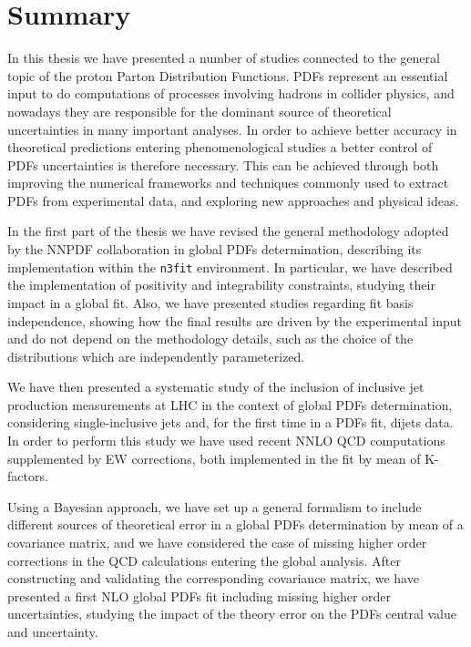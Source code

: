 \chapter{Summary}
\label{ch:conclusions}
In this thesis we have presented a number of studies connected to the general topic of the proton Parton Distribution Functions.
PDFs represent an essential input to do computations of processes involving hadrons in collider physics, and nowadays
they are responsible for the dominant source of theoretical uncertainties in many important analyses.
In order to achieve better accuracy in theoretical predictions entering phenomenological studies 
a better control of PDFs uncertainties is therefore necessary. This can be achieved through both
improving the numerical frameworks and techniques commonly used to extract PDFs from experimental data, 
and exploring new approaches and physical ideas. 

%
In the first part of the thesis we have revised the general methodology adopted by the NNPDF collaboration in 
global PDFs determination, describing its implementation within the {\tt n3fit} environment. In particular,
we have described the implementation of positivity and integrability constraints, studying their impact in
a global fit. Also, we have presented studies regarding fit basis independence, showing how the final results 
are driven by the experimental input and do not depend on the methodology details, such as the choice of the distributions
which are independently parameterized.

%
We have then presented a systematic study of the inclusion of inclusive jet production measurements at LHC in the context of global
PDFs determination, considering single-inclusive jets and, for the first time in a PDFs fit, dijets data.
In order to perform this study we have used recent NNLO QCD computations supplemented by EW corrections,
both implemented in the fit by mean of K-factors. 

%
Using a Bayesian approach, we have set up a general formalism to include different sources of theoretical error
in a global PDFs determination by mean of a covariance matrix,
and we have considered the case of missing higher order corrections in the QCD calculations entering the global analysis.
After constructing and validating the corresponding covariance matrix, we have presented a first NLO global PDFs fit 
including missing higher order uncertainties, studying the impact of the theory error on the PDFs central value and uncertainty.

